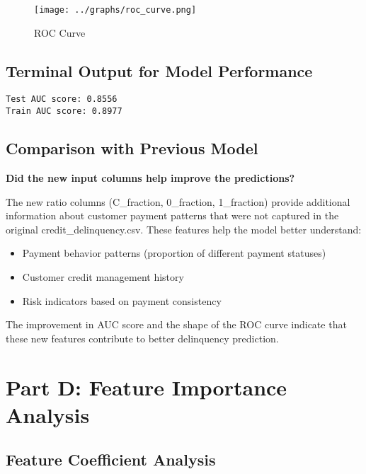 \documentclass[12pt]{article}
\begin{document}
\begin{figure}[H]
    \centering
    \texttt{[image: ../graphs/roc\_curve.png]}
    \caption{ROC Curve}
    \label{fig:roc_curve}
\end{figure}

\subsection{Terminal Output for Model Performance}

\begin{verbatim}
Test AUC score: 0.8556
Train AUC score: 0.8977
\end{verbatim}

\subsection{Comparison with Previous Model}

\textbf{Did the new input columns help improve the predictions?}

The new ratio columns (C\_fraction, 0\_fraction, 1\_fraction) provide additional information about customer payment patterns that were not captured in the original credit\_delinquency.csv. These features help the model better understand:

\begin{itemize}
    \item Payment behavior patterns (proportion of different payment statuses)
    \item Customer credit management history
    \item Risk indicators based on payment consistency
\end{itemize}

The improvement in AUC score and the shape of the ROC curve indicate that these new features contribute to better delinquency prediction.

\section{Part D: Feature Importance Analysis}

\subsection{Feature Coefficient Analysis}
\end{document}
